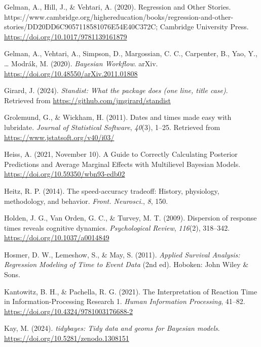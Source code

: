 \documentclass[
  english,
  man, donotrepeattitle,floatsintext]{apa6}
\newlength{\cslhangindent}
\newenvironment{CSLReferences}[2] %
 {\begin{list}{}{%
  \setlength{\itemindent}{0pt}
  \setlength{\leftmargin}{0pt}
  \setlength{\parsep}{0pt}
  \ifodd #1
   \setlength{\leftmargin}{\cslhangindent}
   \setlength{\itemindent}{-1\cslhangindent}
  \fi
  \setlength{\itemsep}{#2\baselineskip}}}
 {\end{list}}
\begin{document}
\begin{CSLReferences}{1}{0}
Gelman, A., Hill, J., \& Vehtari, A. (2020). Regression and {Other Stories}. https://www.cambridge.org/highereducation/books/regression-and-other-stories/DD20DD6C9057118581076E54E40C372C; Cambridge University Press. \url{https://doi.org/10.1017/9781139161879}

Gelman, A., Vehtari, A., Simpson, D., Margossian, C. C., Carpenter, B., Yao, Y., \ldots{} Modrák, M. (2020). \emph{Bayesian {Workflow}}. arXiv. \url{https://doi.org/10.48550/arXiv.2011.01808}

Girard, J. (2024). \emph{Standist: What the package does (one line, title case)}. Retrieved from \url{https://github.com/jmgirard/standist}

Grolemund, G., \& Wickham, H. (2011). Dates and times made easy with {lubridate}. \emph{Journal of Statistical Software}, \emph{40}(3), 1--25. Retrieved from \url{https://www.jstatsoft.org/v40/i03/}

Heiss, A. (2021, November 10). A Guide to Correctly Calculating Posterior Predictions and Average Marginal Effects with Multilievel {Bayesian} Models. \url{https://doi.org/10.59350/wbn93-edb02}

Heitz, R. P. (2014). The speed-accuracy tradeoff: History, physiology, methodology, and behavior. \emph{Front. Neurosci.}, \emph{8}, 150.

Holden, J. G., Van Orden, G. C., \& Turvey, M. T. (2009). Dispersion of response times reveals cognitive dynamics. \emph{Psychological Review}, \emph{116}(2), 318--342. \url{https://doi.org/10.1037/a0014849}

Hosmer, D. W., Lemeshow, S., \& May, S. (2011). \emph{Applied {Survival Analysis}: {Regression Modeling} of {Time} to {Event Data}} (2nd ed). Hoboken: John Wiley \& Sons.

Kantowitz, B. H., \& Pachella, R. G. (2021). The {Interpretation} of {Reaction Time} in {Information-Processing Research} 1. \emph{Human Information Processing}, 41--82. \url{https://doi.org/10.4324/9781003176688-2}

Kay, M. (2024). \emph{{tidybayes}: Tidy data and geoms for {Bayesian} models}. \url{https://doi.org/10.5281/zenodo.1308151}


\end{CSLReferences}
\end{document}
